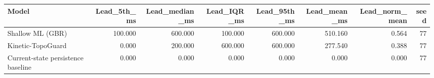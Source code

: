 \begin{tabular}{lrrrrrrr}
\toprule
Model & Lead\_5th\_ms & Lead\_median\_ms & Lead\_IQR\_ms & Lead\_95th\_ms & Lead\_mean\_ms & Lead\_norm\_mean & seed \\
\midrule
Shallow ML (GBR) & 100.000 & 600.000 & 100.000 & 600.000 & 510.160 & 0.564 & 77 \\
Kinetic-TopoGuard & 0.000 & 200.000 & 600.000 & 600.000 & 277.540 & 0.388 & 77 \\
Current-state persistence baseline & 0.000 & 0.000 & 0.000 & 0.000 & 0.000 & 0.000 & 77 \\
\bottomrule
\end{tabular}